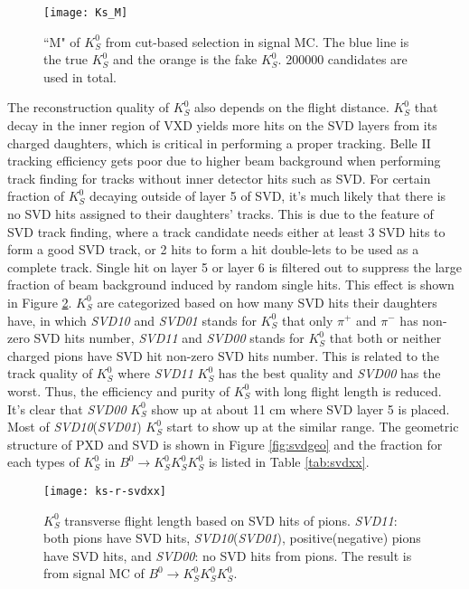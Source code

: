 \begin{figure}[ht]
	\centering 
	\texttt{[image: Ks\_M]}
	\caption{``M" of $K_S^0$ from cut-based selection in signal MC. The blue line is the true $K_S^0$ and the orange is the fake $K_S^0$. 200000 candidates are used in total. }
	\label{fig:ksM_sigmc}
\end{figure}
\begin{comment}
The $K_S^0$ candidates from ``stdKshort:merged" is the default way to obtain $K_S^0$ in the current BASF2, 
however, the limitation of this cut-based $K_S^0$ reconstruction is the pollution from fake $K_S^0$. Using these $K_S^0$ candidates to reconstruct $B^0 \to K_S^0  K_S^0  K_S^0$, as long as one of three $K_S^0$ is fake, the reconstructed $B^0$ is fake, too. 
\end{comment}

 The reconstruction quality of $K_S^0$ also depends on the flight distance. $K_S^0$ that decay in the inner region of VXD yields more hits on the SVD layers from its charged daughters, which is critical in performing a proper tracking. Belle II tracking efficiency gets poor due to higher beam background when performing track finding for tracks without inner detector hits such as SVD. For certain fraction of $K_S^0$ decaying outside of layer 5 of SVD, it's much likely that there is no SVD hits assigned to their daughters' tracks. This is due to the feature of SVD track finding, where a track candidate needs either at least 3 SVD hits to form a good SVD track, or 2 hits to form a hit double-lets to be used as a complete track. Single hit on layer 5 or layer 6 is filtered out to suppress the large fraction of beam background induced by random single hits. This effect is shown in Figure \ref{fig:ks-r-svdxx}. $K_S^0$ are categorized based on how many SVD hits their daughters have, in which \textit{SVD10} and \textit{SVD01} stands for $K_S^0$ that only $\pi^+$ and $\pi^-$ has non-zero SVD hits number, \textit{SVD11} and \textit{SVD00} stands for $K_S^0$ that both or neither charged pions have SVD hit non-zero SVD hits number. This is related to the track quality of $K_S^0$ where \textit{SVD11} $K_S^0$ has the best quality and \textit{SVD00} has the worst. Thus, the efficiency and purity of $K_S^0$ with long flight length is reduced. It's clear that \textit{SVD00} $K_S^0$ show up at about 11 cm where SVD layer 5 is placed. Most of \textit{SVD10}(\textit{SVD01}) $K_S^0$ start to show up at the similar range. The geometric structure of PXD and SVD is shown in Figure \ref{fig:svdgeo} and the fraction for each types of $K_S^0$ in $B^0 \to K_S^0  K_S^0  K_S^0$ is listed in Table \ref{tab:svdxx}.
\begin{figure}[htpb]
	\centering
	\texttt{[image: ks-r-svdxx]}
	\caption{$K_S^0$ transverse flight length based on SVD hits of pions. \textit{SVD11}: both pions have SVD hits, \textit{SVD10}(\textit{SVD01}), positive(negative) pions have SVD hits, and \textit{SVD00}: no SVD hits from pions. The result is from signal MC of $B^0 \to K_S^0  K_S^0  K_S^0$.}
	\label{fig:ks-r-svdxx}
\end{figure}

